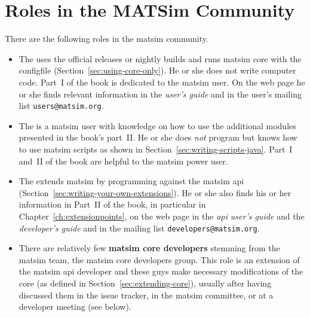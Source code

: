 \section{Roles in the MATSim Community}
\label{sec:roles}
There are the following roles in the \gls{matsim} community.
%
\begin{itemize}\styleItemize
\item The  uses the official releases or nightly builds and runs \gls{matsim} core with the \gls{configfile} (Section~\ref{sec:using-core-only}). He or she does not write computer code. Part~I of the book is dedicated to the \gls{matsim} user. On the web page he or she finds relevant information in the \emph{user's guide} and in the user's mailing list \lstinline|users@matsim.org|.
%
\item The  is a \gls{matsim} user with knowledge on how to use the additional modules presented in the book's part~II. He or she does \emph{not} program but knows how to use \gls{matsim} scripts as shown in Section~\ref{sec:writing-scripts-java}. Part~I and~II of the book are helpful to the \gls{matsim} power user.
%
\item The  extends \gls{matsim} by programming against the \gls{matsim} \gls{api} (Section~\ref{sec:writing-your-own-extensions}). He or she also finds his or her information in Part~II of the book, in particular in Chapter~\ref{ch:extensionpoints}, on the web page in the \emph{\gls{api} user's guide} and the \emph{developer's guide} and in the mailing list \lstinline|developers@matsim.org|.
%
%
\item There are relatively few \textbf{\gls{matsim} core developers} stemming from the \gls{matsim} team, \ie the \gls{matsim} core developers group. This role is an extension of the \gls{matsim} \gls{api} developer and these guys make necessary modifications of the core (as defined in Section~\ref{sec:extending-core}), usually after having discussed them in the issue tracker, in the \gls{matsim} committee, or at a developer meeting (see below). 
%
\end{itemize}
